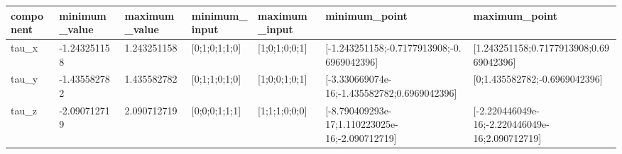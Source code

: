 \begin{tabular}{@{}lllllll@{}}
\toprule
component & minimum\_value & maximum\_value & minimum\_input & maximum\_input & minimum\_point & maximum\_point \\
\midrule
tau\_x & -1.243251158 & 1.243251158 & [0;1;0;1;1;0] & [1;0;1;0;0;1] & [-1.243251158;-0.7177913908;-0.6969042396] & [1.243251158;0.7177913908;0.6969042396] \\
tau\_y & -1.435582782 & 1.435582782 & [0;1;1;0;1;0] & [1;0;0;1;0;1] & [-3.330669074e-16;-1.435582782;0.6969042396] & [0;1.435582782;-0.6969042396] \\
tau\_z & -2.090712719 & 2.090712719 & [0;0;0;1;1;1] & [1;1;1;0;0;0] & [-8.790409293e-17;1.110223025e-16;-2.090712719] & [-2.220446049e-16;-2.220446049e-16;2.090712719] \\
\bottomrule
\end{tabular}
